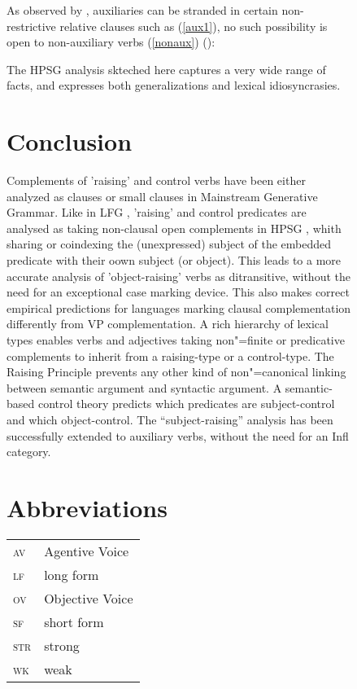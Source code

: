 \documentclass[output=paper
                ,modfonts
                ,nonflat
	        ,collection
	        ,collectionchapter
	        ,collectiontoclongg
 	        ,biblatex
                ,babelshorthands
                ,newtxmath
                ,draftmode
                ,colorlinks, citecolor=brown
]{./langsci/langscibook}
\begin{document}
\begin{figure}
\eal
{}
\zl

As observed by \citet{ArnoldandBorsley2008}, auxiliaries can be stranded in certain non-restrictive relative clauses such as (\ref{aux1}), no such possibility is open to non-auxiliary verbs (\ref{nonaux}) ():

\eal
{}
\zl

The HPSG analysis skteched here captures a very wide range of facts, and expresses both generalizations and lexical idiosyncrasies.


	
\section{Conclusion}
Complements of 'raising' and control verbs have been either analyzed as clauses \citep{Chomsky1981} or small clauses \citep{Stowell1981,Stowell1983} in Mainstream Generative Grammar.
Like in LFG \citep{Bresnan1982}, 'raising' and control predicates are analysed as taking non-clausal open complements in HPSG \citep{PollardandSag1994}, whith sharing or coindexing the (unexpressed) subject of the embedded predicate with their oown subject (or object). This leads to a more accurate analysis of 'object-raising' verbs as ditransitive, without the need for an exceptional case marking device. This also makes correct empirical predictions for languages marking clausal complementation differently from VP complementation. A rich hierarchy of lexical types enables verbs and adjectives taking non"=finite or predicative complements to inherit from a raising-type or a control-type. The Raising Principle prevents any other kind of non"=canonical linking between semantic argument and syntactic argument. A semantic-based control theory predicts which predicates are subject-control and which object-control. The ``subject-raising'' analysis has been successfully extended to auxiliary verbs, without the need for an Infl category.




\section*{Abbreviations}

\begin{tabularx}{.45\textwidth}{lX}
\textsc{av} & Agentive Voice\\
\textsc{lf} & long form\\ 
\textsc{ov} & Objective Voice\\
\textsc{sf} & short form\\
\textsc{str} & strong\\
\textsc{wk} & weak\\


\end{tabularx}
\end{figure}
\end{document}
